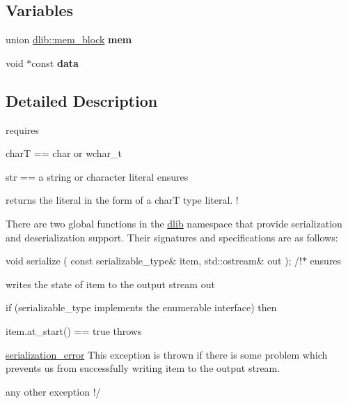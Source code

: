 \subsection*{Variables}
\begin{DoxyCompactItemize}
\item 
\hypertarget{namespacedlib_a7fb617da1a86ef17870d75dd52a8112a}{
union \hyperlink{uniondlib_1_1mem__block}{dlib::mem\_\-block} {\bfseries mem}}
\label{namespacedlib_a7fb617da1a86ef17870d75dd52a8112a}

\item 
\hypertarget{namespacedlib_aaf90d7d28af819b88c07f7720ba126cb}{
void $\ast$const {\bfseries data}}
\label{namespacedlib_aaf90d7d28af819b88c07f7720ba126cb}

\end{DoxyCompactItemize}


\subsection{Detailed Description}
requires
\begin{DoxyItemize}
\item charT == char or wchar\_\-t
\item str == a string or character literal ensures
\item returns the literal in the form of a charT type literal. !
\end{DoxyItemize}

There are two global functions in the \hyperlink{namespacedlib}{dlib} namespace that provide serialization and deserialization support. Their signatures and specifications are as follows:

void serialize ( const serializable\_\-type\& item, std::ostream\& out ); /!$\ast$ ensures
\begin{DoxyItemize}
\item writes the state of item to the output stream out
\item if (serializable\_\-type implements the enumerable interface) then
\begin{DoxyItemize}
\item item.at\_\-start() == true throws
\end{DoxyItemize}
\item \hyperlink{classdlib_1_1serialization__error}{serialization\_\-error} This exception is thrown if there is some problem which prevents us from successfully writing item to the output stream.
\item any other exception !/
\end{DoxyItemize}

